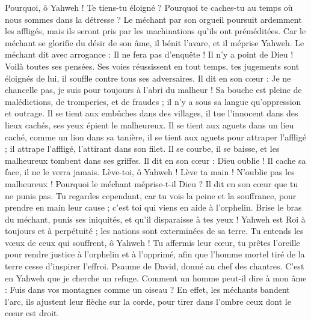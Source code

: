 \begin{multicols}{2}
\VerseOne{}Pourquoi, ô Yahweh ! Te tiens-tu éloigné ? Pourquoi te caches-tu au temps où nous sommes dans la détresse ?
Le méchant par son orgueil poursuit ardemment les affligés, mais ils seront pris par les machinations qu’ils ont préméditées.
Car le méchant se glorifie du désir de son âme, il bénit l'avare, et il méprise Yahweh.
Le méchant dit avec arrogance : Il ne fera pas d’enquête ! Il n’y a point de Dieu ! Voilà toutes ses pensées.
Ses voies réussissent en tout temps, tes jugements sont éloignés de lui, il souffle contre tous ses adversaires.
Il dit en son cœur : Je ne chancelle pas, je suis pour toujours à l’abri du malheur !
Sa bouche est pleine de malédictions, de tromperies, et de fraudes ; il n'y a sous sa langue qu'oppression et outrage.
Il se tient aux embûches dans des villages, il tue l'innocent dans des lieux cachés, ses yeux épient le malheureux.
Il se tient aux aguets dans un lieu caché, comme un lion dans sa tanière, il se tient aux aguets pour attraper l'affligé ; il attrape l'affligé, l'attirant dans son filet.
Il se courbe, il se baisse, et les malheureux tombent dans ses griffes.
Il dit en son cœur : Dieu oublie ! Il cache sa face, il ne le verra jamais.
Lève-toi, ô Yahweh ! Lève ta main ! N’oublie pas les malheureux !
Pourquoi le méchant méprise-t-il Dieu ? Il dit en son cœur que tu ne punis pas.
Tu regardes cependant, car tu vois la peine et la souffrance, pour prendre en main leur cause ; c’est toi qui viens en aide à l’orphelin.
Brise le bras du méchant, punis ses iniquités, et qu’il disparaisse à tes yeux !
Yahweh est Roi à toujours et à perpétuité ; les nations sont exterminées de sa terre.
Tu entends les vœux de ceux qui souffrent, ô Yahweh ! Tu affermis leur cœur, tu prêtes l’oreille
pour rendre justice à l'orphelin et à l’opprimé, afin que l'homme mortel tiré de la terre cesse d’inspirer l’effroi.
\VerseOne{}Psaume de David, donné au chef des chantres. C’est en Yahweh que je cherche un refuge. Comment un homme peut-il dire à mon âme : Fuis dans vos montagnes comme un oiseau ?
En effet, les méchants bandent l'arc, ils ajustent leur flèche sur la corde, pour tirer dans l’ombre ceux dont le cœur est droit.

\end{multicols}
